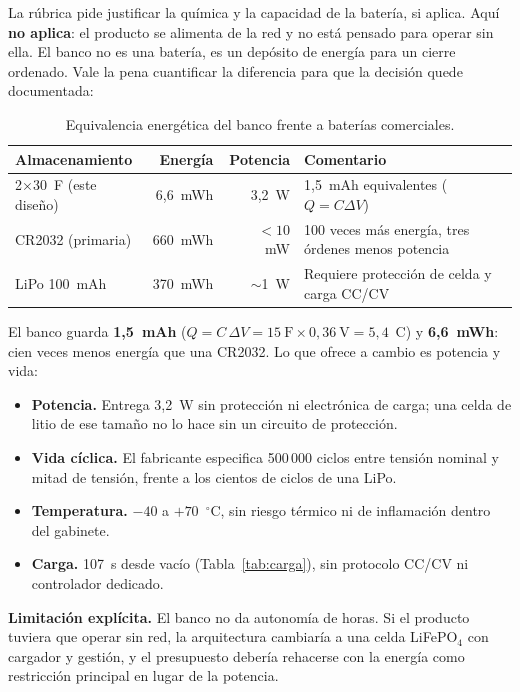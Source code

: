 \documentclass[11pt,a4paper]{article}
\begin{document}
La rúbrica pide justificar la química y la capacidad de la batería, si aplica.
Aquí \textbf{no aplica}: el producto se alimenta de la red y no está pensado
para operar sin ella. El banco no es una batería, es un depósito de energía para
un cierre ordenado. Vale la pena cuantificar la diferencia para que la decisión
quede documentada:

\begin{table}[H]
\centering
\caption{Equivalencia energética del banco frente a baterías comerciales.}
\label{tab:bateria}
\small
\begin{tabularx}{\textwidth}{@{}l r r X@{}}
\toprule
\textbf{Almacenamiento} & \textbf{Energía} & \textbf{Potencia} & \textbf{Comentario} \\
\midrule
2$\times$30~F (este diseño) & 6,6~mWh & 3,2~W & 1,5~mAh equivalentes ($Q=C\Delta V$) \\
CR2032 (primaria) & 660~mWh & $<10$~mW & 100 veces más energía, tres órdenes menos potencia \\
LiPo 100~mAh & 370~mWh & $\sim$1~W & Requiere protección de celda y carga CC/CV \\
\bottomrule
\end{tabularx}
\end{table}

\noindent El banco guarda \textbf{1,5~mAh} ($Q = C\,\Delta V = 15~\mathrm{F}
\times 0{,}36~\mathrm{V} = 5{,}4$~C) y \textbf{6,6~mWh}: cien veces menos energía
que una CR2032. Lo que ofrece a cambio es potencia y vida:

\begin{itemize}
  \item \textbf{Potencia.} Entrega 3,2~W sin protección ni electrónica de
        carga; una celda de litio de ese tamaño no lo hace sin un circuito de
        protección.
  \item \textbf{Vida cíclica.} El fabricante especifica 500\,000 ciclos entre
        tensión nominal y mitad de tensión, frente a los cientos de ciclos de
        una LiPo.
  \item \textbf{Temperatura.} $-40$ a $+70$~$^\circ$C, sin riesgo térmico ni de
        inflamación dentro del gabinete.
  \item \textbf{Carga.} 107~s desde vacío (Tabla~\ref{tab:carga}), sin
        protocolo CC/CV ni controlador dedicado.
\end{itemize}

\noindent\textbf{Limitación explícita.} El banco no da autonomía de horas. Si el
producto tuviera que operar sin red, la arquitectura cambiaría a una celda
LiFePO$_4$ con cargador y gestión, y el presupuesto debería rehacerse con la
energía como restricción principal en lugar de la potencia.
\end{document}
